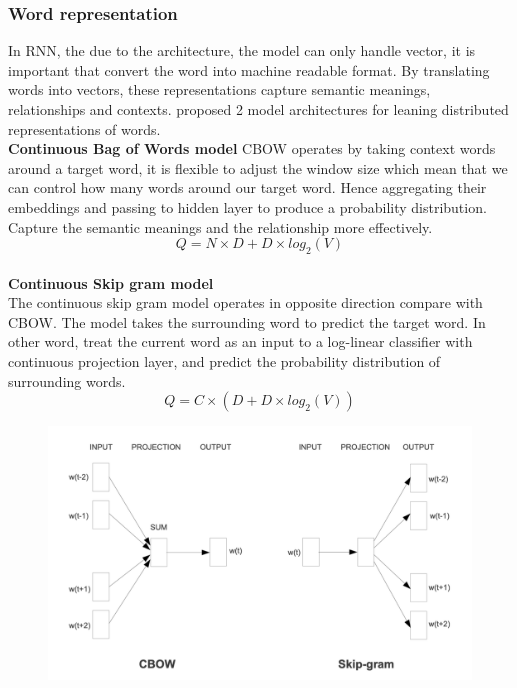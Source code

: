 \documentclass[12pt,a4paper]{article}
\begin{document}
\newpage

\subsubsection{Word representation}
In RNN, the due to the architecture, the model can only handle vector, it is important that convert the word into machine readable format. By translating words into vectors, these representations capture semantic meanings, relationships and contexts. \parencite{mikolov2013efficient} proposed 2 model architectures for leaning distributed representations of words.
\\[1ex]
\textbf{Continuous Bag of Words model}
CBOW operates by taking context words around a target word, it is flexible to adjust the window size which mean that we can control how many words around our target word. Hence aggregating their embeddings and passing to hidden layer to produce a probability distribution. Capture the semantic meanings and the relationship more effectively. 
\begin{equation}
    Q = N \times D + D \times log_2(V)
\end{equation}
\\[1ex]
\textbf{Continuous Skip gram model}
\\[1ex]
The continuous skip gram model operates in opposite direction compare with CBOW. The model takes the surrounding word to predict the target word. In other word, treat the current word as an input to a log-linear classifier with continuous projection layer, and predict the probability distribution of surrounding words.
\begin{equation}
    Q = C \times (D + D \times log_2(V))
\end{equation}
\begin{figure}[!htb]
    \centering
    \includegraphics[width=1\textwidth]{../Pic/word_representation.png} %
\end{figure}
\end{document}

